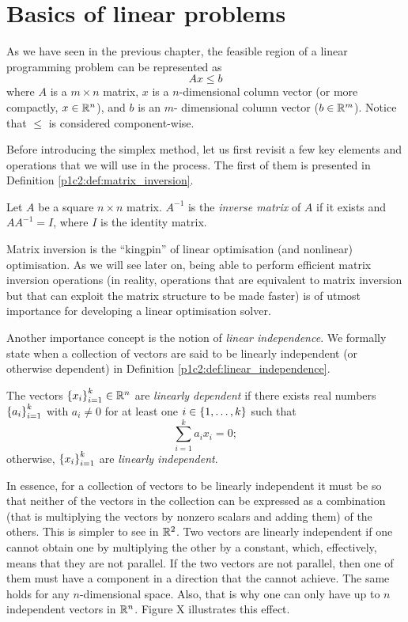 \section{Basics of linear problems}

As we have seen in the previous chapter, the feasible region of a linear programming problem can be represented as
%
\begin{equation} \label{p1c2:eq:feasible_region_inequality}
	Ax \leq b	
\end{equation}
%
where $A$ is a $m \times n$ matrix, $x$ is a $n$-dimensional column vector (or more compactly, $x \in \mathbb{R}^n$), and $b$ is an $m$- dimensional column vector ($b \in \mathbb{R}^m$). Notice that $\leq$ is considered component-wise.

Before introducing the simplex method, let us first revisit a few key elements and operations that we will use in the process. The first of them is presented in Definition \ref{p1c2:def:matrix_inversion}.
%
\begin{definition} \label{p1c2:def:matrix_inversion}
	Let $A$ be a square $n \times n$ matrix. $A^{-1}$ is the \emph{inverse matrix} of $A$ if it exists and $AA^{-1} = I$, where $I$ is the identity matrix.
\end{definition}
%
Matrix inversion is the ``kingpin'' of linear optimisation (and nonlinear) optimisation. As we will see later on, being able to perform efficient matrix inversion operations (in reality, operations that are equivalent to matrix inversion but that can exploit the matrix structure to be made faster) is of utmost importance for developing a linear optimisation solver. 

Another importance concept is the notion of \emph{linear independence}. We formally state when a collection of vectors are said to be linearly independent (or otherwise dependent) in Definition \ref{p1c2:def:linear_independence}. 

%
\begin{definition} \label{p1c2:def:linear_independence}
	The vectors $\left\{ x_i \right \}_{i=1}^k \in \mathbb{R}^n$  are \emph{linearly dependent} if there exists real numbers $\left\{ a_i \right \}_{i=1}^k$ with $a_i \neq 0$ for at least one $i \in \left\{ 1,\dots, k \right \}$ such that
	$$
		\sum_{i=1}^k a_i x_i= 0;
	$$
	otherwise, $\left\{ x_i \right \}_{i=1}^k$ are \emph{linearly independent}.
\end{definition}

In essence, for a collection of vectors to be linearly independent it must be so that neither of the vectors in the collection can be expressed as a combination (that is multiplying the vectors by nonzero scalars and adding them) of the others. This is simpler to see in $\mathbb{R}^2$. Two vectors are linearly independent if one cannot obtain one by multiplying the other by a constant, which, effectively, means that they are not parallel. If the two vectors are not parallel, then one of them must have a component in a direction that the cannot achieve. The same holds for any $n$-dimensional space. Also, that is why one can only have up to $n$ independent vectors in $\mathbb{R}^n$. Figure X illustrates this effect. 

